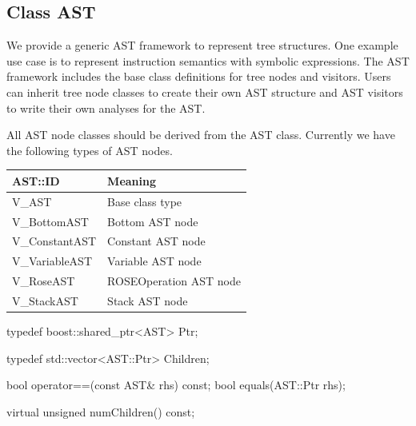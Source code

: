 \subsection{Class AST}
\label{sec:ast}

We provide a generic AST framework to represent tree structures.
One example use case is to represent instruction semantics with symbolic expressions.
The AST framework includes the base class definitions for tree nodes and visitors.
Users can inherit tree node classes to create their own AST structure and
AST visitors to write their own analyses for the AST.

All AST node classes should be derived from the AST class.  Currently we have the
following types of AST nodes.

\begin{center}
\begin{tabular}{ll}
\toprule
AST::ID  & Meaning \\
\midrule
    V\_AST & Base class type \\
    V\_BottomAST & Bottom AST node \\
    V\_ConstantAST & Constant AST node \\
    V\_VariableAST & Variable AST node \\
    V\_RoseAST & ROSEOperation AST node \\
    V\_StackAST & Stack AST node \\
\bottomrule
\end{tabular}
\end{center}

\begin{apient}
typedef boost::shared_ptr<AST> Ptr;
\end{apient}

\begin{apient}
typedef std::vector<AST::Ptr> Children;
\end{apient}

\begin{apient}
bool operator==(const AST& rhs) const;
bool equals(AST::Ptr rhs);
\end{apient}

\begin{apient}
virtual unsigned numChildren() const;
\end{apient}

